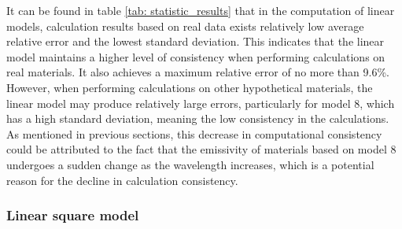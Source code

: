It can be found in table \ref{tab: statistic_results} that in the computation of linear models, 
calculation results based on real data exists relatively low average relative error and the lowest 
standard deviation. This indicates that the linear model maintains a higher 
level of consistency when performing calculations on real materials. It also 
achieves a maximum relative error of no more than 9.6\%. However, when 
performing calculations on other hypothetical materials, the linear model may 
produce relatively large errors, particularly for model 8, which has a high standard 
deviation, meaning the low consistency in the calculations. As mentioned 
in previous sections, this decrease in computational consistency could be attributed to the 
fact that the emissivity of materials based on model 8 undergoes a sudden change 
as the wavelength increases, which is a potential reason for the decline in 
calculation consistency.


\subsubsection{Linear square model}


